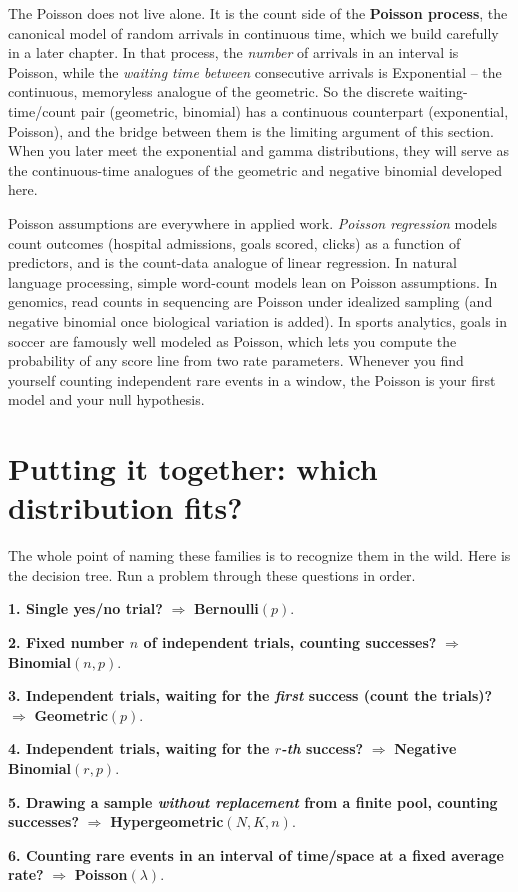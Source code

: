 \begin{connectionbox}
The Poisson does not live alone. It is the count side of the \textbf{Poisson
process}, the canonical model of random arrivals in continuous time, which we
build carefully in a later chapter. In that process, the \emph{number} of arrivals
in an interval is Poisson, while the \emph{waiting time between} consecutive
arrivals is Exponential -- the continuous, memoryless analogue of the geometric. So
the discrete waiting-time/count pair (geometric, binomial) has a continuous counterpart
(exponential, Poisson), and the bridge between them is the limiting argument of
this section. When you later meet the exponential and gamma distributions, they will
serve as the continuous-time analogues of the geometric and negative binomial
developed here.
\end{connectionbox}

\begin{applicationbox}
Poisson assumptions are everywhere in applied work. \emph{Poisson regression}
models count outcomes (hospital admissions, goals scored, clicks) as a function of
predictors, and is the count-data analogue of linear regression. In natural
language processing, simple word-count models lean on Poisson assumptions. In
genomics, read counts in sequencing are Poisson under idealized sampling (and
negative binomial once biological variation is added). In sports analytics, goals
in soccer are famously well modeled as Poisson, which lets you compute the
probability of any score line from two rate parameters. Whenever you find yourself
counting independent rare events in a window, the Poisson is your first model and
your null hypothesis.
\end{applicationbox}

\section{Putting it together: which distribution fits?}
\label{ch07:decision}

The whole point of naming these families is to recognize them in the wild. Here is
the decision tree. Run a problem through these questions in order.

\begin{focusbox}
\textbf{1. Single yes/no trial?} $\Rightarrow$ \textbf{Bernoulli}$(p)$.

\textbf{2. Fixed number $n$ of independent trials, counting successes?}
$\Rightarrow$ \textbf{Binomial}$(n, p)$.

\textbf{3. Independent trials, waiting for the \emph{first} success (count the
trials)?} $\Rightarrow$ \textbf{Geometric}$(p)$.

\textbf{4. Independent trials, waiting for the \emph{$r$-th} success?}
$\Rightarrow$ \textbf{Negative Binomial}$(r, p)$.

\textbf{5. Drawing a sample \emph{without replacement} from a finite pool,
counting successes?} $\Rightarrow$ \textbf{Hypergeometric}$(N, K, n)$.

\textbf{6. Counting rare events in an interval of time/space at a fixed average
rate?} $\Rightarrow$ \textbf{Poisson}$(\lambda)$.
\end{focusbox}

